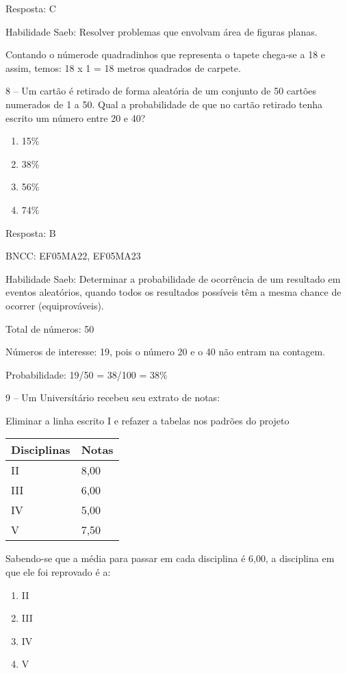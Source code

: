 Resposta: C

Habilidade Saeb: Resolver problemas que envolvam área de figuras planas.

Contando o númerode quadradinhos que representa o tapete chega-se a 18 e
assim, temos: 18 x 1 = 18 metros quadrados de carpete.

8 -- Um cartão é retirado de forma aleatória de um conjunto de 50
cartões numerados de 1 a 50. Qual a probabilidade de que no cartão
retirado tenha escrito um número entre 20 e 40?

\begin{enumerate}
\def\labelenumi{\alph{enumi})}
\item
  15\%
\item
  38\%
\item
  56\%
\item
  74\%
\end{enumerate}

Resposta: B

BNCC: EF05MA22, EF05MA23

Habilidade Saeb: Determinar a probabilidade de ocorrência de um
resultado em eventos aleatórios, quando todos os resultados possíveis
têm a mesma chance de ocorrer (equiprováveis).

Total de números: 50

Números de interesse: 19, pois o número 20 e o 40 não entram na
contagem.

Probabilidade: 19/50 = 38/100 = 38\%

9 -- Um Universítário recebeu seu extrato de notas:

Eliminar a linha escrito I e refazer a tabelas nos padrões do projeto

\begin{longtable}[]{@{}ll@{}}
\toprule
Disciplinas & Notas\tabularnewline
\midrule
\endhead
II & 8,00\tabularnewline
III & 6,00\tabularnewline
IV & 5,00\tabularnewline
V & 7,50\tabularnewline
\bottomrule
\end{longtable}

Sabendo-se que a média para passar em cada disciplina é 6,00, a
disciplina em que ele foi reprovado é a:

\begin{enumerate}
\def\labelenumi{\alph{enumi})}
\item
  II
\item
  III
\item
  IV
\item
  V
\end{enumerate}

